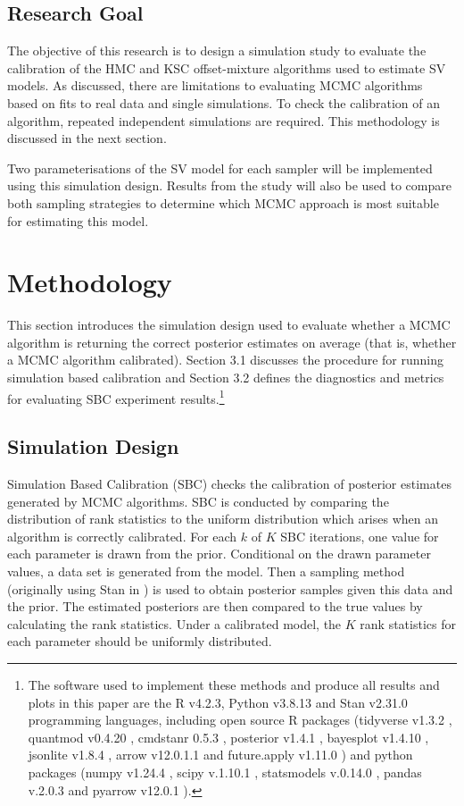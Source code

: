 \documentclass[12pt, a4paper]{article}
\begin{document}
\subsection{Research Goal}
    The objective of this research is to design a simulation study to evaluate the calibration of the HMC and KSC offset-mixture algorithms used to estimate SV models. As discussed, there are limitations to evaluating MCMC algorithms based on fits to real data and single simulations. To check the calibration of an algorithm, repeated independent simulations are required. This methodology is discussed in the next section. 

    Two parameterisations of the SV model for each sampler will be implemented using this simulation design. Results from the study will also be used to compare both sampling strategies to determine which MCMC approach is most suitable for estimating this model. 

\section{Methodology}
This section introduces the simulation design used to evaluate whether a MCMC algorithm is returning the correct posterior estimates on average (that is, whether a MCMC algorithm calibrated). Section 3.1 discusses the procedure for running simulation based calibration and Section 3.2 defines the diagnostics and metrics for evaluating SBC experiment results.\footnote{The software used to implement these methods and produce all results and plots in this paper are the R v4.2.3\citep{rlang}, Python v3.8.13 \citep{10.5555/1593511} and Stan v2.31.0 \citep{stan} programming languages, including open source R packages (tidyverse v1.3.2 \citep{tidyverse}, quantmod v0.4.20 \citep{quantmod}, cmdstanr 0.5.3 \citep{cmdstanr}, posterior v1.4.1 \citep{posteriorr}, bayesplot v1.4.10 \citep{bayesplot}, jsonlite v1.8.4 \citep{jsonlite}, arrow v12.0.1.1 \citep{arrow} and future.apply v1.11.0 \citep{RJ-2021-048}) and python packages (numpy v1.24.4 \citep{harris2020array}, scipy v.1.10.1 \citep{2020SciPy-NMeth}, statsmodels v.0.14.0 \citep{seabold2010statsmodels}, pandas v.2.0.3 \citep{mckinney-proc-scipy-2010} and pyarrow v12.0.1 \citep{arrow}).}

    \subsection{Simulation Design}
        Simulation Based Calibration (SBC) checks the calibration of posterior estimates generated by MCMC algorithms. SBC is conducted by comparing the distribution of rank statistics to the uniform distribution which arises when an algorithm is correctly calibrated. For each $k$ of $K$ SBC iterations, one value for each parameter is drawn from the prior. Conditional on the drawn parameter values, a data set is generated from the model. Then a sampling method (originally using Stan in \citet{talts2020validating}) is used to obtain posterior samples given this data and the prior. The estimated posteriors are then compared to the true values by calculating the rank statistics. Under a calibrated model, the $K$ rank statistics for each parameter should be uniformly distributed. 
\end{document}

